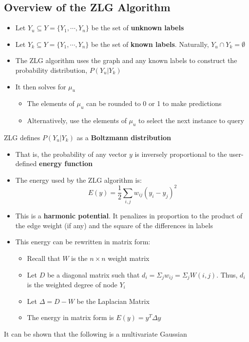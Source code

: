 \documentclass[10pt]{article}
\begin{document}
\subsection*{Overview of the ZLG Algorithm}
\begin{itemize}
	\item Let $Y_u \subseteq Y = \{Y_1, \cdots, Y_n\}$ be the set of \textbf{unknown labels}
	\item Let $Y_k \subseteq Y = \{Y_1, \cdots, Y_n\}$ be the set of \textbf{known labels}.  Naturally, $Y_u \cap Y_k = \emptyset$
	\item The ZLG algorithm uses the graph and any known labels to construct the probability distribution, $P(Y_u | Y_k)$
	\item It then solves for $\mu_u$
	\begin{itemize}
	    \item The elements of $\mu_u$ can be rounded to 0 or 1 to make predictions
	    \item Alternatively, use the elements of $\mu_u$ to select the next instance to query
    \end{itemize}
\end{itemize}
ZLG defines $P(Y_u | Y_k)$ as a \textbf{Boltzmann distribution}
\begin{itemize}
	\item That is, the probability of any vector $y$ is inversely proportional to the user-defined \textbf{energy function}
	\item The energy used by the ZLG algorithm is:
	\[E(y) = \frac{1}{2} \sum_{i, j} w_{ij} (y_i - y_j)^2\]
    \item This is a \textbf{harmonic potential}.  It penalizes in proportion to the product of the edge weight (if any) and the square of the differences in labels
    \item This energy can be rewritten in matrix form:
    \begin{itemize}
	    \item Recall that $W$ is the $n \times n$ weight matrix
	    \item Let $D$ be a diagonal matrix such that $d_i = \Sigma_j w_{ij} = \Sigma_j W(i, j)$.  Thus, $d_i$ is the weighted degree of node $Y_i$
	    \item Let $\Delta = D - W$ be the Laplacian Matrix
	    \item The energy in matrix form is $E(y) = y^T \Delta y$
    \end{itemize}
\end{itemize}
It can be shown that the following is a multivariate Gaussian
\end{document}
